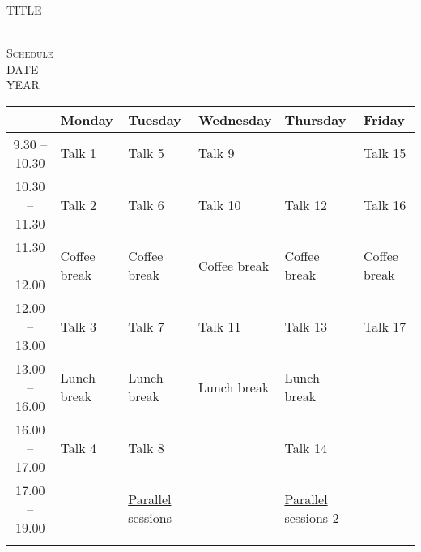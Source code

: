 \documentclass[a4paper]{article}
\begin{document}
\thispagestyle{empty}
\begin{landscape}
\hspace{105mm}	\hypertarget{talks}{\textsc{\Huge TITLE}}\\ %

\hspace{105mm}  \textsc{\LARGE Schedule}
\\

\hspace{113mm}  \textsc{\LARGE DATE} %
\\

\hspace{113mm} {\LARGE YEAR} %

	\def\arraystretch{1.8}%
	\begin{table}[htbp]
	\large
	\begin{tabularx}{1.3\textwidth}{| c | X | X | X | X | X |}
		\hline
    			       & \textbf{Monday}     & \textbf{Tuesday}	 & \textbf{Wednesday} & \textbf{Thursday} & \textbf{Friday}\\ \hline
	      	 9.30 -- 10.30 & {Talk 1}            & {Talk 5}		 & {Talk 9}	      &                   &  {Talk 15}     \\ \hline
		10.30 -- 11.30 & {Talk 2}            & {Talk 6}		 & {Talk 10}  	      &   {Talk 12}       & {Talk 16}       \\ \hline
		11.30 -- 12.00 & Coffee break        & Coffee break 	 & Coffee break       & Coffee break      & Coffee break   \\ \hline
		12.00 -- 13.00 & {Talk 3}            & {Talk 7}  	 & {Talk 11}          &  {Talk 13}         &  {Talk 17}      \\ \hline
		13.00 -- 16.00 & Lunch break 	     & Lunch break       & Lunch break        & Lunch break       &                \\ \hline
		16.00 -- 17.00 & {Talk 4}  	     & {Talk 8}          &                    & {Talk 14}         &   		   \\ \hline
		17.00 -- 19.00 &  &\hyperlink{short1}{Parallel sessions}\hypertarget{bS1}{} & & \hyperlink{short2}{Parallel sessions 2} \hypertarget{bS2}{}& \\ \hline
			       & & & &  &\\ \hline
		\end{tabularx}
	\end{table}
	\normalsize
	\restoregeometry
\end{landscape}
\end{document}
